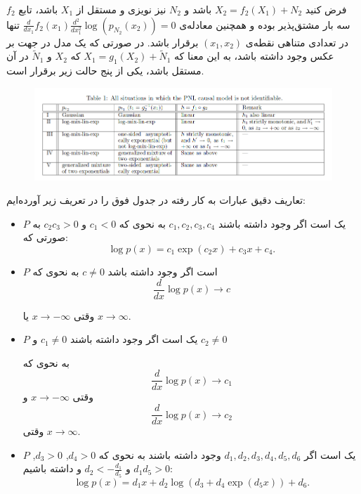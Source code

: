 \documentclass{article}
\begin{document}
\begin{thm}
فرض کنید 
$X_2 = f_2(X_1) + N_2$
باشد و  $N_2$ نیز نویزی 
و مستقل از $X_1$ باشد، تابع $f_2$ سه بار مشتق‌پذیر بوده و همچنین معادله‌ی 
$\frac{d}{dx_1}f_2(x_1)\frac{d^2}{dx_1^2}\log (p_{N_2}(x_2)) = 0$
تنها در تعدادی متناهی نقطه‌ی 
$(x_1, x_2)$
برقرار باشد. در صورتی که یک مدل در جهت بر عکس وجود داشته باشد، به این معنا که
$X_1 = g_1(X_2) + \tilde N_1$
که $X_2$ و
 $\tilde N_1$
در آن مستقل باشد، یکی از پنج حالت زیر برقرار است.
\begin{figure}[h!]
	\centering
	\includegraphics[scale=0.5]{pnl.png}
\end{figure}
\end{thm}
تعاریف دقیق عبارات به کار رفته در جدول فوق را در تعریف زیر آورده‌ایم:
\begin{den}
\begin{itemize}
 فرض کنید $p$ چگالی احتمال یک توزیع پیوسته  $P$ باشد.
\item 
$P$
یک 
است اگر وجود داشته باشند
$c_1, c_2, c_3, c_4$
به نحوی که
$c_1 <0$ 
و
$c_2c_3>0$
به صورتی که:
$$
\log p(x) = c_1 \exp(c_2 x) + c_3 x + c_4.
$$
	
\item 
$P$
	است اگر وجود داشته باشد
$c \neq 0$
    به نحوی که
$$
\frac{d}{dx} \log p(x) \rightarrow c
$$
	
	وقتی $x \rightarrow -\infty$ یا $x \rightarrow \infty$.
	
	\item 
	$P$
	یک
	است اگر وجود داشته باشند
	$c_1 \neq 0$ 
	و
	 $c_2 \neq 0$ 
	 
	به نحوی که
	$$
	\frac{d}{dx} \log p(x) \rightarrow c_1 
	$$
	وقتی 
	 $x \rightarrow -\infty$ 
	 و
	$$
	\frac{d}{dx} \log p(x) \rightarrow c_2 
	$$
	وقتی
	 $x \rightarrow \infty$.
	\item 
	$P$
	یک 
	 است اگر 
 $d_1, d_2, d_3, d_4, d_5, d_6$
 وجود داشته باشند به نحوی که
	 $d_4 > 0$, $d_3 > 0$, $d_1 d_5 > 0$ و $d_2 < -\frac{d_1}{d_5}$ 
	 و داشته باشیم:
	$$
	\log p(x) = d_1 x + d_2 \log(d_3 + d_4 \exp(d_5 x))+ d_6.
	$$

\end{itemize} 
\end{den}
\end{document}

